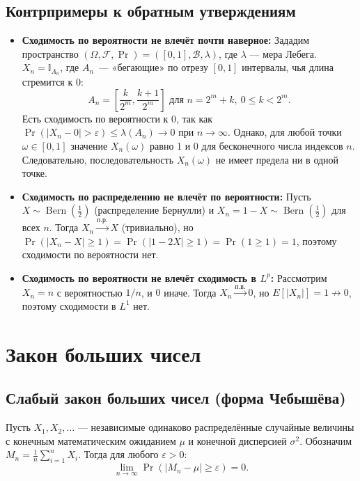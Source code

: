 \documentclass[10pt]{article}
\begin{document}
\subsection*{Контрпримеры к обратным утверждениям}
\begin{itemize}
    \item \textbf{Сходимость по вероятности не влечёт почти наверное:} Зададим пространство $(\Omega, \mathcal{F}, \Pr) = ([0, 1], \mathcal{B}, \lambda)$, где $\lambda$ — мера Лебега. $X_n = \mathbb{I}_{A_n}$, где $A_n$~--- «бегающие» по отрезу $[0,1]$ интервалы, чья длина стремится к $0$: \[ A_n = \left[ \frac{k}{2^m}, \frac{k+1}{2^m} \right] \text{ для } n = 2^m + k, \ 0 \le k < 2^m\text{.} \]
    Есть сходимость по вероятности к 0, так как $\Pr(|X_n - 0| > \varepsilon) \leq \lambda(A_n) \to 0$ при $n \to \infty$. Однако, для любой точки $\omega \in [0, 1]$ значение $X_n(\omega)$ равно 1 и 0 для бесконечного числа индексов $n$. Следовательно, последовательность $X_n(\omega)$ не имеет предела ни в одной точке.
    \item \textbf{Сходимость по распределению не влечёт по вероятности:} Пусть $X \sim \operatorname{Bern}(\frac{1}{2})$ (распределение Бернулли) и $X_n = 1 - X \sim \operatorname{Bern}(\frac{1}{2})$ для всех $n$. Тогда $X_n \xrightarrow{\text{п.р.}} X$ (тривиально), но $\Pr(|X_n-X| \ge 1) = \Pr(|1 - 2X| \ge 1) = \Pr(1 \ge 1) = 1$, поэтому сходимости по вероятности нет.
    \item \textbf{Сходимость по вероятности не влечёт сходимость в $L^p$:} Рассмотрим $X_n = n$ с вероятностью $1/n$, и $0$ иначе. Тогда $X_n \xrightarrow{\text{п.в.}} 0$, но $E[|X_n|] = 1 \not\to 0$, поэтому сходимости в $L^1$ нет.
\end{itemize}


\section{Закон больших чисел}

\subsection{Слабый закон больших чисел (форма Чебышёва)}

\begin{theorem}
Пусть $X_1, X_2, \dots$ — независимые одинаково распределённые случайные величины с конечным математическим ожиданием $\mu$ и конечной дисперсией $\sigma^2$. Обозначим $M_n = \frac{1}{n}\sum_{i=1}^n X_i$. Тогда для любого $\varepsilon > 0$:
\[
\lim_{n\to\infty} \Pr(|M_n - \mu| \ge \varepsilon) = 0.
\]
\end{theorem}
\end{document}
